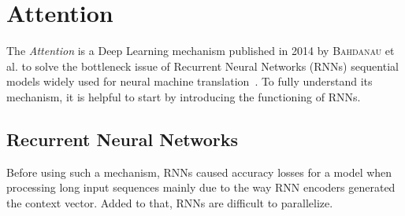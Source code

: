 
\section{Attention}
\label{sec:attention}

The \emph{Attention} is a Deep Learning mechanism published in 2014 by
\textsc{Bahdanau} et al. to solve the bottleneck issue of Recurrent Neural
Networks (RNNs) sequential models widely used for neural machine
translation~\citep{bahdanau}. To fully understand its mechanism, it is helpful
to start by introducing the functioning of RNNs.

\subsection{Recurrent Neural Networks}
\label{subsec:rnns}

Before using such a mechanism, RNNs caused accuracy losses for a model when
processing long input sequences mainly due to the way RNN encoders generated the
context vector. Added to that, RNNs are difficult to parallelize.

